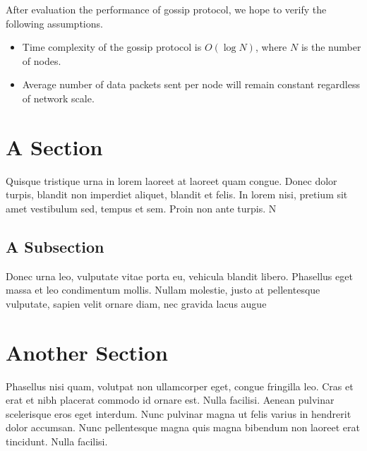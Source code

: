 After evaluation the performance of gossip protocol, we hope to verify the following assumptions.
\begin{itemize}
	\item Time complexity of the gossip protocol is $O(\log N)$, where $N$ is the number of nodes.
	\item Average number of data packets sent per node will remain constant regardless of network scale.
\end{itemize}


\section{A Section}

Quisque tristique urna in lorem laoreet at laoreet quam congue. Donec dolor turpis, blandit non imperdiet aliquet, blandit et felis. In lorem nisi, pretium sit amet vestibulum sed, tempus et sem. Proin non ante turpis. N


\subsection{A Subsection}

Donec urna leo, vulputate vitae porta eu, vehicula blandit libero. Phasellus eget massa et leo condimentum mollis. Nullam molestie, justo at pellentesque vulputate, sapien velit ornare diam, nec gravida lacus augue

\section{Another Section}

Phasellus nisi quam, volutpat non ullamcorper eget, congue fringilla leo. Cras et erat et nibh placerat commodo id ornare est. Nulla facilisi. Aenean pulvinar scelerisque eros eget interdum. Nunc pulvinar magna ut felis varius in hendrerit dolor accumsan. Nunc pellentesque magna quis magna bibendum non laoreet erat tincidunt. Nulla facilisi.